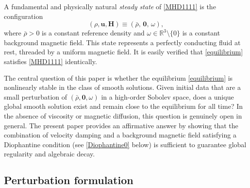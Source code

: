 \documentclass[12pt, reqno]{amsart}
\numberwithin{equation}{section}
\numberwithin{equation}{section}
\numberwithin{equation}{section}
\numberwithin{equation}{section}
\theoremstyle{remark}
\begin{document}
A fundamental and physically natural \emph{steady state} of
\eqref{MHD1111} is the configuration
\begin{equation}\label{equilibrium}
	(\rho,\mathbf{u},\mathbf{H}) \equiv (\bar\rho,\,\mathbf{0},\,\omega),
\end{equation}
where $\bar\rho>0$ is a constant reference density and
$\omega\in\mathbb{R}^3\setminus\{0\}$ is a constant background
magnetic field.  This state represents a perfectly conducting fluid at
rest, threaded by a uniform magnetic field.  It is easily verified
that \eqref{equilibrium} satisfies \eqref{MHD1111} identically.

\medskip
The central question of this paper is whether the
equilibrium \eqref{equilibrium} is nonlinearly stable in the class
of smooth solutions. Given initial data that are a small perturbation of
$(\bar\rho,\mathbf{0},\omega)$ in a high-order Sobolev space, does a
unique global smooth solution exist and remain close to the equilibrium
for all time?  In the absence of viscosity or magnetic diffusion, this
question is genuinely open in general.  The present paper provides an
affirmative answer by showing that the combination of velocity damping
and a background magnetic field satisfying a Diophantine condition
(see \eqref{Diophantine0} below) is sufficient to guarantee global
regularity and algebraic decay.

\subsection{Perturbation formulation}
\end{document}
